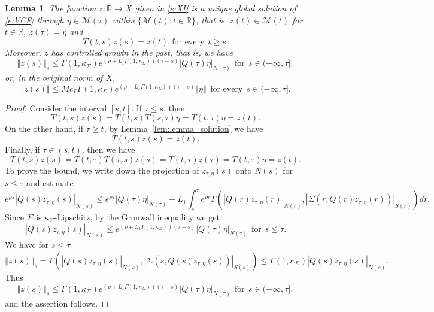 \documentclass[a4paper,11pt,reqno]{amsart}
\theoremstyle{plain}
\newtheorem{lem}{Lemma}[section]
\theoremstyle{definition}
\numberwithin{equation}{section}
\newcommand{\R}{\mathbb{R}}
\newcommand{\calm}{\mathcal M}
\newcommand{\norm}[1]{\left\Vert#1\right\Vert}
\renewcommand{\geq}{\geqslant}
\renewcommand{\leq}{\leqslant}
\begin{document}
\begin{lem}\label{lem:COMPLETETRAJECTORY}
The function $z\colon\R\to X$ given in \eqref{e:XI} is a unique global solution of \eqref{e:VCF} through $\eta\in\calm(\tau)$ within $\{\calm(t)\colon t\in\R\}$, that is,
$z(t)\in\calm(t)$ for $t\in\R$, $z(\tau)=\eta$ and
$$T(t,s)z(s)=z(t)\ \ \text{for every}\ \  t\geq s.$$
Moreover, $z$ has controlled growth in the past, that is, we have
\begin{equation}\label{e:XIBACKWARDS}
\norm{z(s)}_s\leq \Gamma(1,\kappa_\Sigma)e^{(\rho+L_1\Gamma(1,\kappa_\Sigma))(\tau-s)}|Q(\tau)\eta|_{N(\tau)}\ \ \text{for}\ \ s\in (-\infty,\tau],
\end{equation}
or, in the original norm of $X$,
\begin{equation*}%
\norm{z(s)}\leq Mc_\Gamma \Gamma(1,\kappa_\Sigma)e^{(\rho+L_1\Gamma(1,\kappa_\Sigma))(\tau-s)}\norm{\eta}\ \ \text{for every}\ \  s\in (-\infty,\tau].
\end{equation*}
\end{lem}
\begin{proof}
Consider the interval $[s,t]$. If $\tau \leq s$,  then
$$T(t,s)z(s)=T(t,s)T(s,\tau)\eta=T(t,\tau)\eta=z(t).$$
On the other hand, if  $\tau\geq t$, by Lemma~\ref{lem:lemma_solution} %
we have
$$T(t,s)z(s)=z(t).$$
Finally, if  $\tau \in (s,t)$, then we have
$$T(t,s)z(s)=T(t,\tau)T(\tau,s)z(s)=T(t,\tau)z(\tau)=T(t,\tau)\eta=z(t).$$
To prove the bound, we write down the projection of $z_{\tau,\eta}(s)$ onto $N(s)$ for $s\leq\tau$ and estimate
$$e^{\rho s}|Q(s)z_{\tau,\eta}(s)|_{N(s)}\leq e^{\rho\tau}|Q(\tau)\eta|_{N(\tau)}+L_1\int_{s}^{\tau}e^{\rho r}\Gamma(|Q(r)z_{\tau,\eta}(r)|_{N(r)},|\Sigma(r,Q(r)z_{\tau,\eta}(r))|_{S(r)})dr.$$
Since $\Sigma$ is $\kappa_\Sigma$-Lipschitz, by the Gronwall inequality we get
\begin{equation*}
	|Q(s)z_{\tau,\eta}(s)|_{N(s)}\leq e^{(\rho+L_1\Gamma(1,\kappa_\Sigma))(\tau-s)}|Q(\tau)\eta|_{N(\tau)}\ \ \text{for}\ \  s\leq\tau.
\end{equation*}
We have for $s\leq\tau$
$$	\norm{z(s)}_{s}%
 =\Gamma(|Q(s)z_{\tau,\eta}(s)|_{N(s)},|\Sigma(s,Q(s)z_{\tau,\eta}(s))|_{S(s)})\leq\Gamma(1,\kappa_\Sigma)|Q(s)z_{\tau,\eta}(s)|_{N(s)}.$$
Thus
$$\norm{z(s)}_s\leq\Gamma(1,\kappa_\Sigma)e^{(\rho+L_1\Gamma(1,\kappa_\Sigma))(\tau-s)}|Q(\tau)\eta|_{N(\tau)}\ \ \text{for}\ \ s\in (-\infty,\tau],$$
and the assertion follows.
\end{proof}
\end{document}
